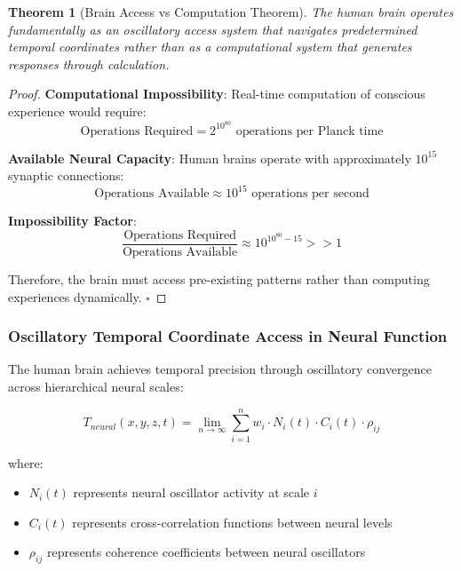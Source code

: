 \documentclass[12pt,a4paper]{article}
\newtheorem{theorem}{Theorem}
\begin{document}
\begin{theorem}[Brain Access vs Computation Theorem]
The human brain operates fundamentally as an oscillatory access system that navigates predetermined temporal coordinates rather than as a computational system that generates responses through calculation.
\end{theorem}

\begin{proof}
\textbf{Computational Impossibility}: Real-time computation of conscious experience would require:
\begin{equation}
\text{Operations Required} = 2^{10^{80}} \text{ operations per Planck time}
\end{equation}

\textbf{Available Neural Capacity}: Human brains operate with approximately $10^{15}$ synaptic connections:
\begin{equation}
\text{Operations Available} \approx 10^{15} \text{ operations per second}
\end{equation}

\textbf{Impossibility Factor}:
\begin{equation}
\frac{\text{Operations Required}}{\text{Operations Available}} \approx 10^{10^{80}-15} >> 1
\end{equation}

Therefore, the brain must access pre-existing patterns rather than computing experiences dynamically. $\square$
\end{proof}

\subsubsection{Oscillatory Temporal Coordinate Access in Neural Function}

The human brain achieves temporal precision through oscillatory convergence across hierarchical neural scales:

\begin{equation}
T_{neural}(x,y,z,t) = \lim_{n \to \infty} \sum_{i=1}^{n} w_i \cdot N_i(t) \cdot C_i(t) \cdot \rho_{ij}
\end{equation}

where:
\begin{itemize}
\item $N_i(t)$ represents neural oscillator activity at scale $i$
\item $C_i(t)$ represents cross-correlation functions between neural levels
\item $\rho_{ij}$ represents coherence coefficients between neural oscillators
\end{itemize}
\end{document}
